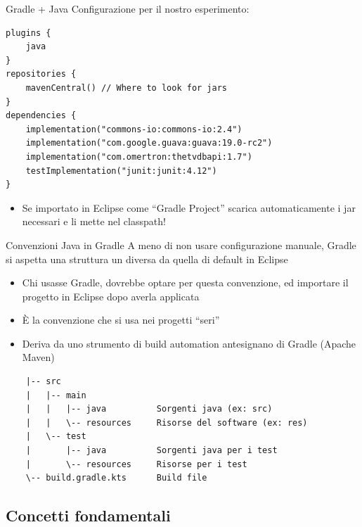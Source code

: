 \documentclass[presentation]{beamer}
\begin{document}
\begin{frame}[fragile]{Gradle + Java}
Configurazione per il nostro esperimento:
\begin{block}{}
\begin{verbatim}
plugins {
    java
}
repositories {
    mavenCentral() // Where to look for jars
}
dependencies {
    implementation("commons-io:commons-io:2.4")
    implementation("com.google.guava:guava:19.0-rc2")
    implementation("com.omertron:thetvdbapi:1.7")
    testImplementation("junit:junit:4.12")
}
\end{verbatim}
\end{block}
\begin{itemize}
    \item Se importato in Eclipse come ``Gradle Project'' scarica automaticamente i jar necessari e li mette nel classpath!
\end{itemize}
\end{frame}

\begin{frame}[fragile]{Convenzioni Java in Gradle}
    A meno di non usare configurazione manuale, Gradle si aspetta una struttura un diversa da quella di default in Eclipse
    \begin{itemize}
        \item Chi usasse Gradle, dovrebbe optare per questa convenzione, ed importare il progetto in Eclipse dopo averla applicata
        \item È la convenzione che si usa nei progetti ``seri''
        \item Deriva da uno strumento di build automation antesignano di Gradle (Apache Maven)
    \end{itemize}
    \begin{verbatim}
    |-- src
    |   |-- main
    |   |   |-- java          Sorgenti java (ex: src)
    |   |   \-- resources     Risorse del software (ex: res)
    |   \-- test
    |       |-- java          Sorgenti java per i test
    |       \-- resources     Risorse per i test
    \-- build.gradle.kts      Build file
    \end{verbatim}
\end{frame}

\subsection{Concetti fondamentali}
\end{document}
